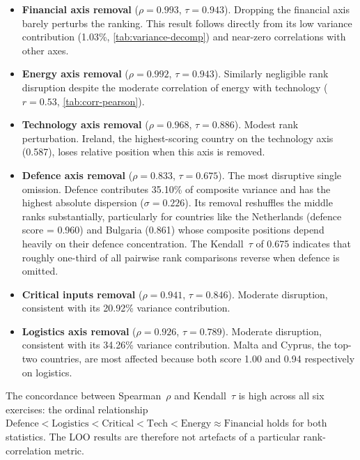 \begin{itemize}[leftmargin=2em]
  \item \textbf{Financial axis removal} ($\rho = 0.993$,
    $\tau = 0.943$).
    Dropping the financial axis barely perturbs the ranking.
    This result follows directly from its low variance contribution
    (1.03\%, \cref{tab:variance-decomp}) and near-zero
    correlations with other axes.

  \item \textbf{Energy axis removal} ($\rho = 0.992$,
    $\tau = 0.943$).
    Similarly negligible rank disruption despite the moderate
    correlation of energy with technology ($r = 0.53$,
    \cref{tab:corr-pearson}).

  \item \textbf{Technology axis removal} ($\rho = 0.968$,
    $\tau = 0.886$).
    Modest rank perturbation.  Ireland, the highest-scoring
    country on the technology axis (0.587), loses relative
    position when this axis is removed.

  \item \textbf{Defence axis removal} ($\rho = 0.833$,
    $\tau = 0.675$).
    The most disruptive single omission.  Defence contributes
    35.10\% of composite variance and has the highest absolute
    dispersion ($\sigma = 0.226$).  Its removal reshuffles the
    middle ranks substantially, particularly for countries like
    the Netherlands (defence score = 0.960) and Bulgaria
    (0.861) whose composite positions depend heavily on
    their defence concentration.  The Kendall~$\tau$ of 0.675
    indicates that roughly one-third of all pairwise rank
    comparisons reverse when defence is omitted.

  \item \textbf{Critical inputs removal} ($\rho = 0.941$,
    $\tau = 0.846$).
    Moderate disruption, consistent with its 20.92\% variance
    contribution.

  \item \textbf{Logistics axis removal} ($\rho = 0.926$,
    $\tau = 0.789$).
    Moderate disruption, consistent with its 34.26\% variance
    contribution.  Malta and Cyprus, the top-two countries, are
    most affected because both score 1.00 and 0.94 respectively
    on logistics.
\end{itemize}

The concordance between Spearman~$\rho$ and Kendall~$\tau$ is
high across all six exercises: the ordinal relationship
$\text{Defence} < \text{Logistics} < \text{Critical} < \text{Tech}
< \text{Energy} \approx \text{Financial}$ holds for both statistics.
The LOO results are therefore not artefacts of a particular
rank-correlation metric.

